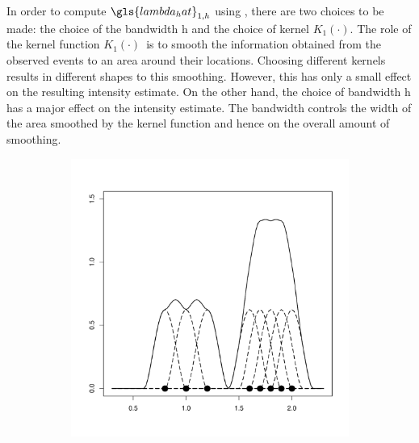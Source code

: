 In order to compute $\gls{lambda_hat}_{1,h}$ using ,
there are two choices to be made: the choice of the bandwidth \gls{h}
and the choice of \gls{kernel} $K_1(\cdot)$.
The role of the \gls{kernel} function $K_1(\cdot)$~is to smooth the information obtained
from the observed \glspl{event} to an area around their locations.
Choosing different \glspl{kernel} results in different shapes to this smoothing.
However, this has only a small effect on the resulting \gls{intensity} estimate.
On the other hand,
the choice of bandwidth \gls{h} has a major effect on the \gls{intensity} estimate.
The bandwidth controls the width of the area smoothed by the \gls{kernel} function and hence on the overall amount of smoothing.

\begin{figure}[H]
    \centering
    \begin{subfigure}[t]{0.32\textwidth}
        \includegraphics[width=\textwidth]{img/kernel1d-02}
        \label{fig:theory:kernel1d:02}
    \end{subfigure}
    \begin{subfigure}[t]{0.32\textwidth}

\end{subfigure}
\end{figure}
